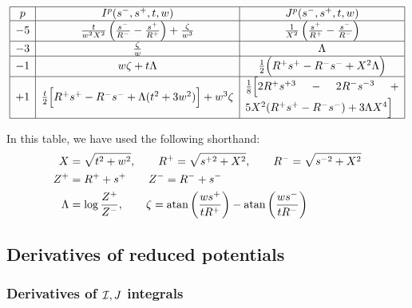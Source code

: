 \documentclass[letterpaper]{article}
\begin{document}
$$\begin{array}{|c|c|c|}\hline
p 
& 
I^p(s^-, s^+, t, w)
&
J^p(s^-, s^+, t, w)
\\\hline
-5 
&
\frac{t}{w^2 X^2}\left( \frac{s^-}{R^-} - \frac{s^+}{R^+} \right)
+\frac{\zeta}{w^3} 
&
\frac{1}{X^2}\left( \frac{s^+}{R^+} - \frac{s^-}{R^-} \right)
\\\hline
-3 
&
\frac{\zeta}{w}
&
\Lambda
\\\hline
-1 
&
w\zeta + t\Lambda
&
\frac{1}{2}\Big(R^+ s^+ - R^- s^- + X^2 \Lambda\Big)
\\\hline
+1 
&
\frac{t}{2}\Big[R^+ s^+ - R^- s^- + \Lambda(t^2 + 3w^2)\Big]
 + w^3 \zeta
&
\parbox{0.4\textwidth}{$
\frac{1}{8}\Big[2R^+ s^{+3} - 2R^- s^{-3} + 5X^2(R^+ s^+ - R^- s^-)
 + 3\Lambda X^4\Big]$}
\\\hline
\end{array}$$

In this table, we have used the following shorthand:
\begin{align*}
 X&=\sqrt{t^2 + w^2},
 \qquad
 R^+=\sqrt{s^{+2} + X^2},
 \qquad
 R^-=\sqrt{s^{-2} + X^2}
\\
 Z^+ &= R^+ + s^+ 
\qquad 
 Z^- = R^- + s^-
\\
 \Lambda &= \log\frac{Z^+}{Z^-}, \qquad 
 \zeta   = \text{atan}\left(\frac{w s^+}{tR^+}\right) - \text{atan}\left(\frac{w s^-}{tR^-}\right)
\end{align*}

\subsection{Derivatives of reduced potentials}

\subsubsection{Derivatives of $\mathcal{I},J$ integrals}
\end{document}
